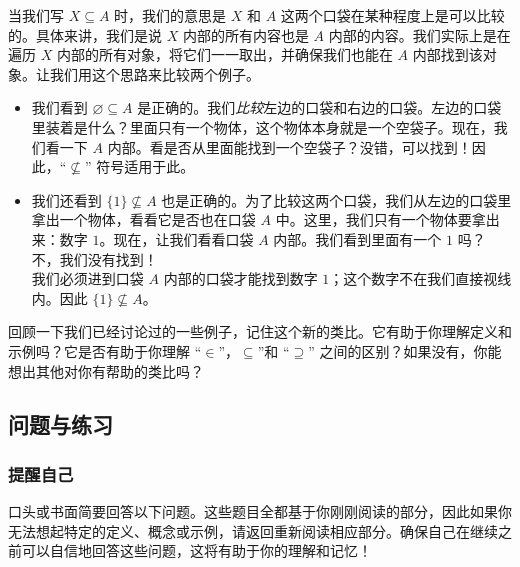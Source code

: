 当我们写 $X \subseteq A$ 时，我们的意思是 $X$ 和 $A$ 这两个口袋在某种程度上是可以比较的。具体来讲，我们是说 $X$ 内部的所有内容也是 $A$ 内部的内容。我们实际上是在遍历 $X$ 内部的所有对象，将它们一一取出，并确保我们也能在 $A$ 内部找到该对象。让我们用这个思路来比较两个例子。

\begin{itemize}
    \item 我们看到 ${\varnothing} \subseteq A$ 是正确的。我们\textit{比较}左边的口袋和右边的口袋。左边的口袋里装着是什么？里面只有一个物体，这个物体本身就是一个空袋子。现在，我们看一下 $A$ 内部。看是否从里面能找到一个空袋子？没错，可以找到！因此，``$\nsubseteq$'' 符号适用于此。
    \item 我们还看到 $\{1\} \nsubseteq A$ 也是正确的。为了比较这两个口袋，我们从左边的口袋里拿出一个物体，看看它是否也在口袋 $A$ 中。这里，我们只有一个物体要拿出来：数字 $1$。现在，让我们看看口袋 $A$ 内部。我们看到里面有一个 $1$ 吗？ 不，我们没有找到！\\
    我们必须进到口袋 $A$ 内部的口袋才能找到数字 $1$；这个数字不在我们直接视线内。因此 $\{1\} \nsubseteq A$。
\end{itemize}

回顾一下我们已经讨论过的一些例子，记住这个新的类比。它有助于你理解定义和示例吗？它是否有助于你理解 ``$\in$''，$\subseteq$''和 ``$\supseteq$'' 之间的区别？如果没有，你能想出其他对你有帮助的类比吗？

\subsection{问题与练习}

\subsubsection*{提醒自己}

口头或书面简要回答以下问题。这些题目全都基于你刚刚阅读的部分，因此如果你无法想起特定的定义、概念或示例，请返回重新阅读相应部分。确保自己在继续之前可以自信地回答这些问题，这将有助于你的理解和记忆！

